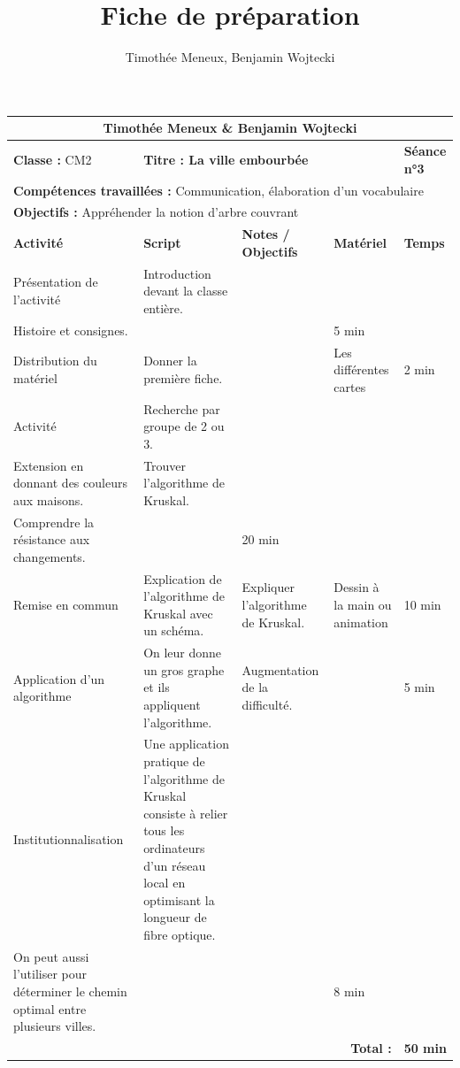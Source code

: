 \documentclass[10pt]{article}
\title{\Huge Fiche de préparation}
\author{\Large Timothée Meneux, Benjamin Wojtecki}
\date{}
\begin{document}
\maketitle


\begin{center}
\renewcommand\cellalign{tl}
\begin{tabular}{|p{3.5cm}|p{6.5cm}|p{3.5cm}|p{3.5cm}|p{2cm}|}
\hline
\multicolumn{5}{|c|}{\textbf{\Large Timothée Meneux \& Benjamin Wojtecki}} \\
\hline
\textbf{Classe :} CM2 & \multicolumn{3}{l|}{\textbf{Titre : La ville embourbée}} & \textbf{Séance n°3} \\
\hline
\multicolumn{5}{|l|}{\textbf{Compétences travaillées :} Communication, élaboration d'un vocabulaire} \\
\multicolumn{5}{|l|}{\textbf{Objectifs :} Appréhender la notion d'arbre couvrant} \\
\hline
\rowcolor{gray!30}
\textbf{Activité} & \textbf{Script} & \textbf{Notes / Objectifs} & \textbf{Matériel} & \textbf{Temps} \\
\hline
Présentation de l'activité 
& \raggedright Introduction devant la classe entière.\\ Histoire et consignes. 
& & & 5 min \\
\hline
Distribution du matériel 
& \raggedright Donner la première fiche. 
& & Les différentes cartes & 2 min \\
\hline
Activité 
& \raggedright Recherche par groupe de 2 ou 3.\\ Extension en donnant des couleurs aux maisons.
& \raggedright Trouver l'algorithme de Kruskal.\\ Comprendre la résistance aux changements.
& & 20 min \\
\hline
Remise en commun 
& \raggedright Explication de l'algorithme de Kruskal avec un schéma.
& \raggedright Expliquer l'algorithme de Kruskal.
& Dessin à la main ou animation & 10 min \\
\hline
Application d'un algorithme 
& \raggedright On leur donne un gros graphe et ils appliquent l'algorithme.
& \raggedright Augmentation de la difficulté.
& & 5 min \\
\hline
Institutionnalisation 
& \raggedright Une application pratique de l’algorithme de Kruskal consiste à relier tous les ordinateurs d’un réseau local en optimisant la longueur de fibre optique.\\
On peut aussi l’utiliser pour déterminer le chemin optimal entre plusieurs villes.
& & & 8 min \\
\hline
\multicolumn{4}{|r|}{\textbf{Total :}} & \textbf{50 min} \\
\hline
\end{tabular}
\end{center}
\end{document}
